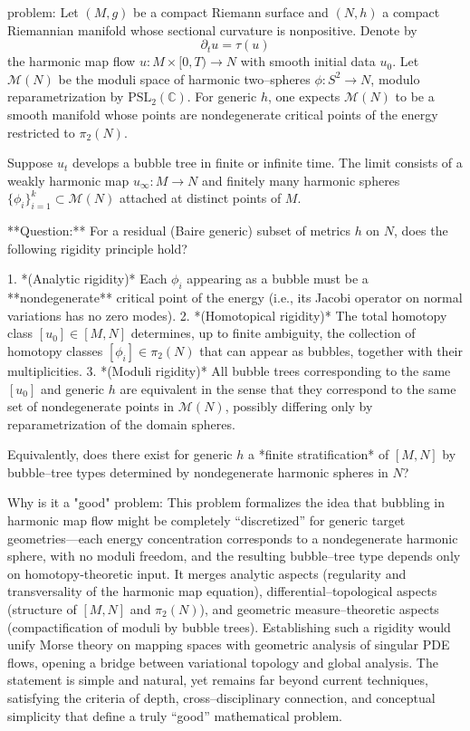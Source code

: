 problem:  
Let \( (M,g) \) be a compact Riemann surface and \( (N,h) \) a compact Riemannian manifold whose sectional curvature is nonpositive. Denote by  
\[
\partial_t u = \tau(u)
\]
the harmonic map flow \( u: M\times [0,T)\to N \) with smooth initial data \(u_0\).  Let \( \mathcal{M}(N) \) be the moduli space of harmonic two–spheres \( \phi:S^2\to N \), modulo reparametrization by \( \mathrm{PSL}_2(\mathbb{C}) \).  
For generic \(h\), one expects \(\mathcal{M}(N)\) to be a smooth manifold whose points are nondegenerate critical points of the energy restricted to \( \pi_2(N) \).

Suppose \( u_t \) develops a bubble tree in finite or infinite time.  The limit consists of a weakly harmonic map \(u_\infty:M\to N\) and finitely many harmonic spheres \( \{ \phi_i\}_{i=1}^k\subset \mathcal{M}(N)\) attached at distinct points of \(M\).  

**Question:**  
For a residual (Baire generic) subset of metrics \(h\) on \(N\), does the following rigidity principle hold?

1. *(Analytic rigidity)* Each $\phi_i$ appearing as a bubble must be a **nondegenerate** critical point of the energy (i.e., its Jacobi operator on normal variations has no zero modes).  
2. *(Homotopical rigidity)* The total homotopy class \([u_0]\in [M,N]\) determines, up to finite ambiguity, the collection of homotopy classes \([\phi_i]\in \pi_2(N)\) that can appear as bubbles, together with their multiplicities.  
3. *(Moduli rigidity)* All bubble trees corresponding to the same \([u_0]\) and generic \(h\) are equivalent in the sense that they correspond to the same set of nondegenerate points in \(\mathcal{M}(N)\), possibly differing only by reparametrization of the domain spheres.  

Equivalently, does there exist for generic \(h\) a *finite stratification* of \([M,N]\) by bubble–tree types determined by nondegenerate harmonic spheres in \(N\)?  

Why is it a "good" problem:  
This problem formalizes the idea that bubbling in harmonic map flow might be completely “discretized” for generic target geometries—each energy concentration corresponds to a nondegenerate harmonic sphere, with no moduli freedom, and the resulting bubble–tree type depends only on homotopy‐theoretic input. It merges analytic aspects (regularity and transversality of the harmonic map equation), differential–topological aspects (structure of \( [M,N] \) and \( \pi_2(N) \)), and geometric measure–theoretic aspects (compactification of moduli by bubble trees). Establishing such a rigidity would unify Morse theory on mapping spaces with geometric analysis of singular PDE flows, opening a bridge between variational topology and global analysis. The statement is simple and natural, yet remains far beyond current techniques, satisfying the criteria of depth, cross–disciplinary connection, and conceptual simplicity that define a truly “good” mathematical problem.
